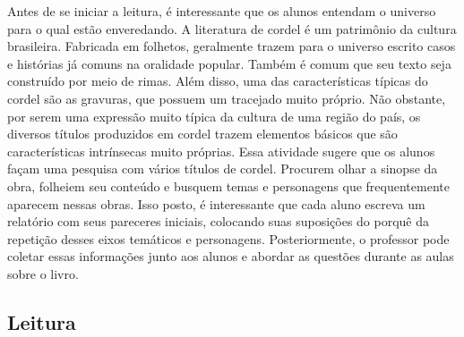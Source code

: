 \documentclass[12pt]{extarticle}
\begin{document}
Antes de se iniciar a leitura, é interessante que os alunos
entendam o universo para o qual estão enveredando. A literatura de
cordel é um patrimônio da cultura brasileira. Fabricada em folhetos,
geralmente trazem para o universo escrito casos e histórias já comuns na
oralidade popular. Também é comum que seu texto seja construído por meio
de rimas. Além disso, uma das características típicas do cordel são as
gravuras, que possuem um tracejado muito próprio. Não obstante, por
serem uma expressão muito típica da cultura de uma região do país, os
diversos títulos produzidos em cordel trazem elementos básicos que são
características intrínsecas muito próprias. Essa atividade sugere que os
alunos façam uma pesquisa com vários títulos de cordel. Procurem olhar a
sinopse da obra, folheiem seu conteúdo e busquem temas e personagens que
frequentemente aparecem nessas obras. Isso posto, é interessante que
cada aluno escreva um relatório com seus pareceres iniciais, colocando
suas suposições do porquê da repetição desses eixos temáticos e
personagens. Posteriormente, o professor pode coletar essas informações
junto aos alunos e abordar as questões durante as aulas sobre o livro.


\subsection{Leitura}


\end{document}
